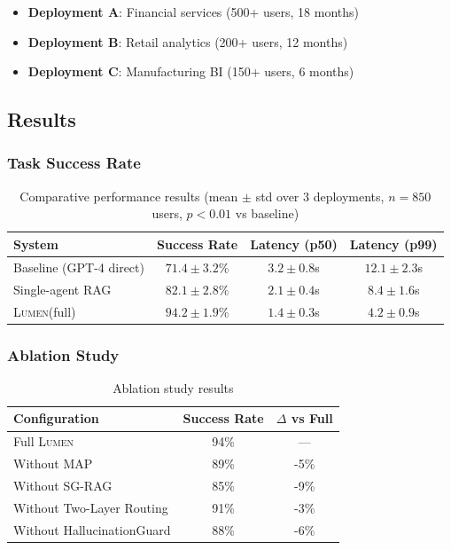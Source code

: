 \documentclass[11pt,a4paper]{article}
\theoremstyle{definition}
\theoremstyle{remark}
\newcommand{\lumen}{\textsc{Lumen}\xspace}
\newcommand{\map}{\textsc{MAP}\xspace}
\newcommand{\sgrag}{\textsc{SG-RAG}\xspace}
\begin{document}
\begin{itemize}
    \item \textbf{Deployment A}: Financial services (500+ users, 18 months)
    \item \textbf{Deployment B}: Retail analytics (200+ users, 12 months)
    \item \textbf{Deployment C}: Manufacturing BI (150+ users, 6 months)
\end{itemize}

\subsection{Results}

\subsubsection{Task Success Rate}

\begin{table}[H]
\centering
\begin{tabular}{lccc}
\toprule
\textbf{System} & \textbf{Success Rate} & \textbf{Latency (p50)} & \textbf{Latency (p99)} \\
\midrule
Baseline (GPT-4 direct) & $71.4 \pm 3.2\%$ & $3.2 \pm 0.8$s & $12.1 \pm 2.3$s \\
Single-agent RAG & $82.1 \pm 2.8\%$ & $2.1 \pm 0.4$s & $8.4 \pm 1.6$s \\
\lumen (full) & $\mathbf{94.2 \pm 1.9\%}$ & $\mathbf{1.4 \pm 0.3}$s & $\mathbf{4.2 \pm 0.9}$s \\
\bottomrule
\end{tabular}
\caption{Comparative performance results (mean $\pm$ std over 3 deployments, $n=850$ users, $p < 0.01$ vs baseline)}
\label{tab:results}
\end{table}

\subsubsection{Ablation Study}

\begin{table}[H]
\centering
\begin{tabular}{lcc}
\toprule
\textbf{Configuration} & \textbf{Success Rate} & \textbf{$\Delta$ vs Full} \\
\midrule
Full \lumen & 94\% & --- \\
Without \map & 89\% & -5\% \\
Without \sgrag & 85\% & -9\% \\
Without Two-Layer Routing & 91\% & -3\% \\
Without HallucinationGuard & 88\% & -6\% \\
\bottomrule
\end{tabular}
\caption{Ablation study results}
\label{tab:ablation}
\end{table}
\end{document}
